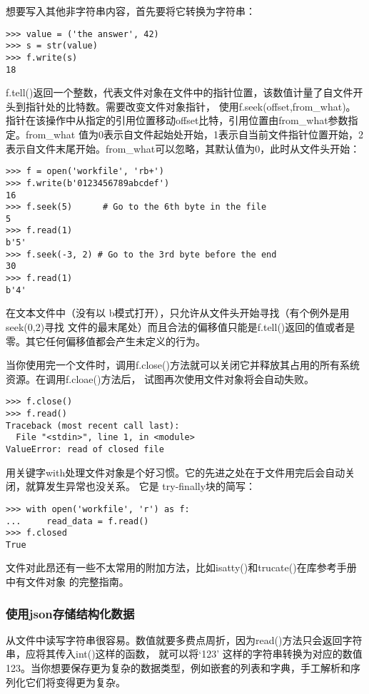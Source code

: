 \documentclass[UTF8]{ctexart}
\begin{document}
想要写入其他非字符串内容，首先要将它转换为字符串：
\begin{verbatim}
>>> value = ('the answer', 42)
>>> s = str(value)
>>> f.write(s)
18
\end{verbatim}

f.tell()返回一个整数，代表文件对象在文件中的指针位置，该数值计量了自文件开头到指针处的比特数。需要改变文件对象指针，
使用f.seek(offset,from\_what)。指针在该操作中从指定的引用位置移动offset比特，引用位置由from\_what参数指定。from\_what
值为0表示自文件起始处开始，1表示自当前文件指针位置开始，2表示自文件末尾开始。from\_what可以忽略，其默认值为0，此时从文件头开始：
\begin{verbatim}
>>> f = open('workfile', 'rb+')
>>> f.write(b'0123456789abcdef')
16
>>> f.seek(5)      # Go to the 6th byte in the file
5
>>> f.read(1)
b'5'
>>> f.seek(-3, 2) # Go to the 3rd byte before the end
30
>>> f.read(1)
b'4'
\end{verbatim}

在文本文件中（没有以 b模式打开），只允许从文件头开始寻找（有个例外是用seek(0,2)寻找
文件的最末尾处）而且合法的偏移值只能是f.tell()返回的值或者是零。其它任何偏移值都会产生未定义的行为。

当你使用完一个文件时，调用f.close()方法就可以关闭它并释放其占用的所有系统资源。在调用f.cloae()方法后，
试图再次使用文件对象将会自动失败。
\begin{verbatim}
>>> f.close()
>>> f.read()
Traceback (most recent call last):
  File "<stdin>", line 1, in <module>
ValueError: read of closed file
\end{verbatim}

用关键字with处理文件对象是个好习惯。它的先进之处在于文件用完后会自动关闭，就算发生异常也没关系。
它是 try-finally块的简写：
\begin{verbatim}
>>> with open('workfile', 'r') as f:
...     read_data = f.read()
>>> f.closed
True
\end{verbatim}

文件对此昂还有一些不太常用的附加方法，比如isatty()和trucate()在库参考手册中有文件对象
的完整指南。

\subsubsection{使用json存储结构化数据}
从文件中读写字符串很容易。数值就要多费点周折，因为read()方法只会返回字符串，应将其传入int()这样的函数，
就可以将`123' 这样的字符串转换为对应的数值123。当你想要保存更为复杂的数据类型，例如嵌套的列表和字典，手工解析和序列化它们将变得更为复杂。
\end{document}
